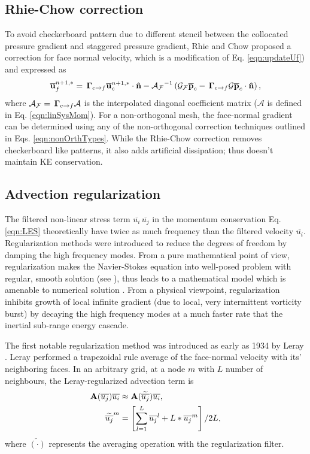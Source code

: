 \subsection{Rhie-Chow correction}
\label{sec: Rhie-Chow}
To avoid checkerboard pattern due to different stencil between the collocated pressure gradient and staggered pressure gradient, Rhie and Chow \cite{rhie1983} proposed a correction for face normal velocity, which is a modification of Eq. \eqref{eqn:updateUf}) and expressed as
\begin{align}
\overline{\mathbf{u}}_f^{n+1, *} = \, \mathbf{\Gamma}_{c \rightarrow f} \overline{\mathbf{u}}_c^{n+1, *} \cdot \mathbf{\hat{n}}
- \mathcal{A_F}^{-1}\left(\mathcal{G_F} \overline{\mathbf{p}}_c - \, \mathbf{\Gamma}_{c \rightarrow f} \mathcal{G} \overline{\mathbf{p}}_c \cdot \mathbf{\hat{n}} \right),
\label{eqn:updateUfRC}
\end{align}
where $\mathcal{A_F} = \, \mathbf{\Gamma}_{c \rightarrow f} \mathcal{A} $ is the interpolated diagonal coefficient matrix ($\mathcal{A}$ is defined in Eq. \eqref{eqn:linSysMom}). For a non-orthogonal mesh, the face-normal gradient can be determined using any of the non-orthogonal correction techniques outlined in Eqs. \eqref{eqn:nonOrthTypes}. While the Rhie-Chow correction removes checkerboard like patterns, it also adds artificial dissipation; thus doesn't maintain KE conservation.


\subsection{Advection regularization}
\label{sec:advReg}
The filtered non-linear stress term $ \overline{u_i} \, \overline{u_j} $ in the momentum conservation Eq. \eqref{eqn:LES} theoretically have twice as much frequency than the filtered velocity $\overline{u_i}$. Regularization methods were introduced to reduce the degrees of freedom by damping the high frequency modes. From a pure mathematical point of view, regularization makes the Navier-Stokes equation into well-posed problem with regular, smooth solution (see \cite[chapter 4.2]{sagaut2006les}), thus leads to a mathematical model which is amenable to numerical solution \cite{verstappen2008}. From a physical viewpoint, regularization inhibits growth of local infinite gradient (due to local, very intermittent vorticity burst) by decaying the high frequency modes at a much faster rate that the inertial sub-range energy cascade\cite{cheskidov2005}.
 
The first notable regularization method was introduced as early as 1934 by Leray \cite{leray1934}. Leray performed a trapezoidal rule average of the face-normal velocity with its' neighboring faces. In an arbitrary grid, at a node $m$ with $L$ number of neighbours, the Leray-regularized advection term is
\begin{align}
{\mathbf{A}(\overline{u_j})} \overline{u_i} & \approx 
{\mathbf{A} ( \widetilde{ \overline{u_j}} ) } \overline{u_i}, 
\\
\widetilde{ \overline{u_j}}^m &= \left[ \sum_{l=1}^L \overline{u_j}^l + L*\overline{u_j}^m \right] / 2L,
\label{eqn:lerayReg}
\end{align}
where $\tilde{(\cdot)}$ represents the averaging operation with the regularization filter.

